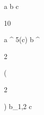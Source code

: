 \begin{eqcode}{\mu}{}{}{}
  a \in {} \lend
  b \in {} \lend
  c \gets
  \begin{tmatrix}
  10  \lend
  \end{tmatrix} \lend
   \lend
  a \gets \genar \limits ^ {5}(c) \lend
  b \gets \genar \limits ^ {  \begin{tmatrix}
  2  \lend
  \end{tmatrix} }( \begin{tmatrix}
  2  \lend
  \end{tmatrix})  \lend
   \lend
  b_{1,2} \gets  c \lend
   \lend
   \lend
\end{eqcode}

